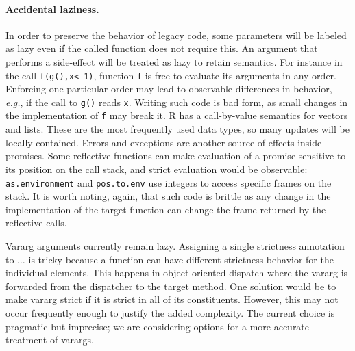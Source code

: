 \documentclass[review,creen,acmsmall]{acmart}
\newcommand{\code}[1]{\lstinline |#1|\xspace}
\renewcommand{\c}[1]{\lstinline |#1|\xspace}
\newcommand{\eg}{\emph{e.g.},\xspace}
\begin{document}
\paragraph{Accidental laziness.} In order to preserve the behavior of legacy
code, some parameters will be labeled as lazy even if the called function does
not require this. An argument that performs a side-effect will be treated as
lazy to retain semantics. For instance in the call \c{f(g(),x<-1)}, function \c
f is free to evaluate its arguments in any order. Enforcing one particular order
may lead to observable differences in behavior, \eg if the call to \c{g()} reads
\c{x}. Writing such code is bad form, as small changes in the implementation of
\c f may break it. R has a call-by-value semantics for vectors and lists. These
are the most frequently used data types, so many updates will be locally
contained. Errors and exceptions are another source of effects inside promises.
Some reflective functions can make evaluation of a promise sensitive to its
position on the call stack, and strict evaluation would be observable:
\code{as.environment} and \code{pos.to.env} use integers to access specific
frames on the stack. It is worth noting, again, that such code is brittle as any
change in the implementation of the target function can change the frame
returned by the reflective calls.

Vararg arguments currently remain lazy. Assigning a single strictness annotation
to $\dots$ is tricky because a function can have different strictness behavior
for the individual elements. This happens in object-oriented dispatch where the
vararg is forwarded from the dispatcher to the target method. One solution would
be to make vararg strict if it is strict in all of its constituents. However,
this may not occur frequently enough to justify the added complexity. The
current choice is pragmatic but imprecise; we are considering options for a more
accurate treatment of varargs.
\end{document}
